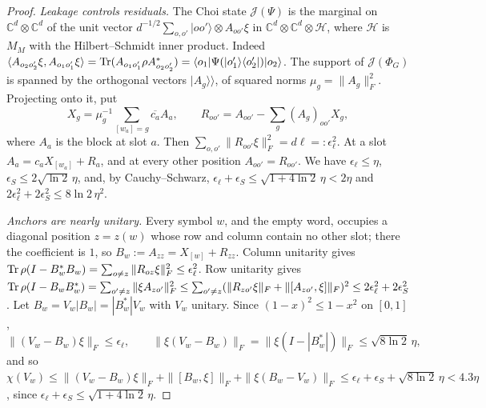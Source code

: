 \begin{proof}
\emph{Leakage controls residuals.} The Choi state $\mathcal J(\Psi)$ is the marginal on $\mathbb C^d\otimes\mathbb C^d$ of the unit vector
$d^{-1/2}\sum_{o,o'}|oo'\rangle\otimes A_{oo'}\xi$ in $\mathbb C^d\otimes\mathbb C^d\otimes\mathcal H$, where $\mathcal H$ is $M_M$ with the Hilbert--Schmidt
inner product. Indeed $\langle A_{o_2o_2'}\xi,A_{o_1o_1'}\xi\rangle=\operatorname{Tr}(A_{o_1o_1'}\rho A_{o_2o_2'}^*)=\langle o_1|\Psi(|o_1'\rangle\langle o_2'|)|o_2\rangle$. The support
of $\mathcal J(\Phi_G)$ is spanned by the orthogonal vectors $|A_g\rangle\!\rangle$, of squared norms $\mu_g=\|A_g\|_F^2$. Projecting onto it, put
\[
X_g=\mu_g^{-1}\sum_{[w_a]=g}\overline{c_a}A_a,\qquad R_{oo'}=A_{oo'}-\sum_g(A_g)_{oo'}X_g,
\]
where $A_a$ is the block at slot $a$. Then $\sum_{o,o'}\|R_{oo'}\xi\|_F^2=d\ell=:\epsilon_\ell^2$. At a slot $A_a=c_aX_{[w_a]}+R_a$, and at every other position
$A_{oo'}=R_{oo'}$. We have $\epsilon_\ell\le\eta$, $\epsilon_S\le2\sqrt{\ln2}\,\eta$, and, by Cauchy--Schwarz, $\epsilon_\ell+\epsilon_S\le\sqrt{1+4\ln2}\,\eta<2\eta$ and
$2\epsilon_\ell^2+2\epsilon_S^2\le8\ln2\,\eta^2$.

\emph{Anchors are nearly unitary.} Every symbol $w$, and the empty word, occupies a diagonal position $z=z(w)$ whose row and column contain
no other slot; there the coefficient is $1$, so $B_w:=A_{zz}=X_{[w]}+R_{zz}$. Column unitarity gives
$\operatorname{Tr}\rho(I-B_w^*B_w)=\sum_{o\ne z}\|R_{oz}\xi\|_F^2\le\epsilon_\ell^2$. Row unitarity gives
$\operatorname{Tr}\rho(I-B_wB_w^*)=\sum_{o'\ne z}\|\xi A_{zo'}\|_F^2\le\sum_{o'\ne z}(\|R_{zo'}\xi\|_F+\|[A_{zo'},\xi]\|_F)^2\le2\epsilon_\ell^2+2\epsilon_S^2$.
Let $B_w=V_w|B_w|=|B_w^*|V_w$ with $V_w$ unitary. Since $(1-x)^2\le1-x^2$ on $[0,1]$,
\[
\|(V_w-B_w)\xi\|_F\le\epsilon_\ell,\qquad\|\xi(V_w-B_w)\|_F=\|\xi(I-|B_w^*|)\|_F\le\sqrt{8\ln2}\,\eta,
\]
and so $\chi(V_w)\le\|(V_w-B_w)\xi\|_F+\|[B_w,\xi]\|_F+\|\xi(B_w-V_w)\|_F\le\epsilon_\ell+\epsilon_S+\sqrt{8\ln2}\,\eta<4.3\eta$, since
$\epsilon_\ell+\epsilon_S\le\sqrt{1+4\ln2}\,\eta$.


\end{proof}
